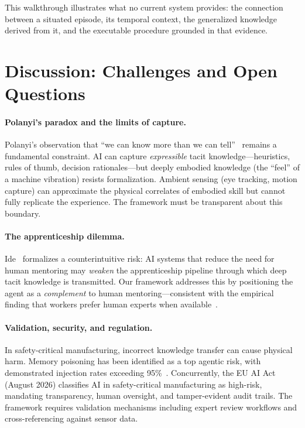 \documentclass[]{ceurart}
\begin{document}
This walkthrough illustrates what no current system provides: the
connection between a situated episode, its temporal context, the
generalized knowledge derived from it, and the executable procedure
grounded in that evidence.

\section{Discussion: Challenges and Open Questions}\label{sec:discuss}

\paragraph{Polanyi's paradox and the limits of capture.}
Polanyi's observation that ``we can know more than we can
tell''~\cite{polanyi1966} remains a fundamental constraint. AI can
capture \emph{expressible} tacit knowledge---heuristics, rules of thumb,
decision rationales---but deeply embodied knowledge (the ``feel'' of a
machine vibration) resists formalization. Ambient sensing (eye tracking,
motion capture) can approximate the physical correlates of embodied skill
but cannot fully replicate the experience. The framework must be
transparent about this boundary.

\paragraph{The apprenticeship dilemma.}
Ide~\cite{ide2026} formalizes a counterintuitive risk: AI systems that
reduce the need for human mentoring may \emph{weaken} the
apprenticeship pipeline through which deep tacit knowledge is
transmitted. Our framework addresses this by positioning the agent as a
\emph{complement} to human mentoring---consistent with the empirical
finding that workers prefer human experts when
available~\cite{freire2024}.

\paragraph{Validation, security, and regulation.}
In safety-critical manufacturing, incorrect knowledge transfer can cause
physical harm. Memory poisoning has been identified as a top agentic
risk, with demonstrated injection rates exceeding
95\%~\cite{owasp2026}. Concurrently, the EU AI Act (August 2026)
classifies AI in safety-critical manufacturing as high-risk, mandating
transparency, human oversight, and tamper-evident audit trails. The
framework requires validation mechanisms including expert review
workflows and cross-referencing against sensor data.
\end{document}

